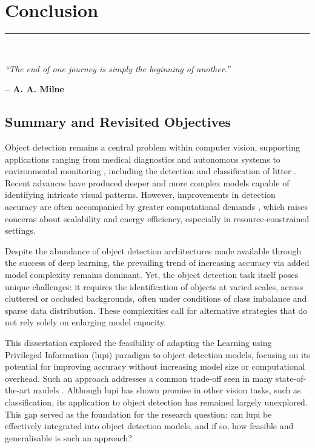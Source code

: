 \graphicspath{{content/chapters/6_conclusion/figures/}}

\chapter{Conclusion}%
\label{chp:conclusion}
\rule{\textwidth}{1pt} \\[1ex]

\epigraph{\textit{``The end of one journey is simply the beginning of another.''}}{\textbf{-- A. A. Milne}}

\section{Summary and Revisited Objectives}
\label{sec:6_summary_objectives}

Object detection remains a central problem within computer vision, supporting applications ranging from medical diagnostics \cite{application_med2} and autonomous systems \cite{application_automation2} to environmental monitoring \cite{application_environment2}, including the detection and classification of litter \cite{soda_dataset}. Recent advances have produced deeper and more complex models capable of identifying intricate visual patterns. However, improvements in detection accuracy are often accompanied by greater computational demands \cite{detr, rt-detr}, which raises concerns about scalability and energy efficiency, especially in resource-constrained settings.

Despite the abundance of object detection architectures made available through the success of deep learning, the prevailing trend of increasing accuracy via added model complexity remains dominant. Yet, the object detection task itself poses unique challenges: it requires the identification of objects at varied scales, across cluttered or occluded backgrounds, often under conditions of class imbalance and sparse data distribution. These complexities call for alternative strategies that do not rely solely on enlarging model capacity.

This dissertation explored the feasibility of adapting the Learning using Privileged Information (\gls{lupi}) paradigm to object detection models, focusing on its potential for improving accuracy without increasing model size or computational overhead. Such an approach addresses a common trade-off seen in many state-of-the-art models \cite{yolov12, rt-detrv2}. Although \gls{lupi} has shown promise in other vision tasks, such as classification, its application to object detection has remained largely unexplored. This gap served as the foundation for the research question: can \gls{lupi} be effectively integrated into object detection models, and if so, how feasible and generalisable is such an approach?

